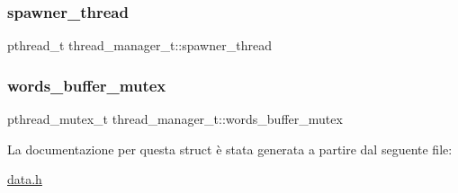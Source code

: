 \subsubsection{\texorpdfstring{spawner\+\_\+thread}{spawner\_thread}}
{\footnotesize\ttfamily pthread\+\_\+t thread\+\_\+manager\+\_\+t\+::spawner\+\_\+thread}

\mbox{\label{structthread__manager__t_acbf655b8885eb6344c889df3bdc04914}} 
\subsubsection{\texorpdfstring{words\+\_\+buffer\+\_\+mutex}{words\_buffer\_mutex}}
{\footnotesize\ttfamily pthread\+\_\+mutex\+\_\+t thread\+\_\+manager\+\_\+t\+::words\+\_\+buffer\+\_\+mutex}



La documentazione per questa struct è stata generata a partire dal seguente file\+:\begin{DoxyCompactItemize}
\item 
\hyperlink{data_8h}{data.\+h}\end{DoxyCompactItemize}

